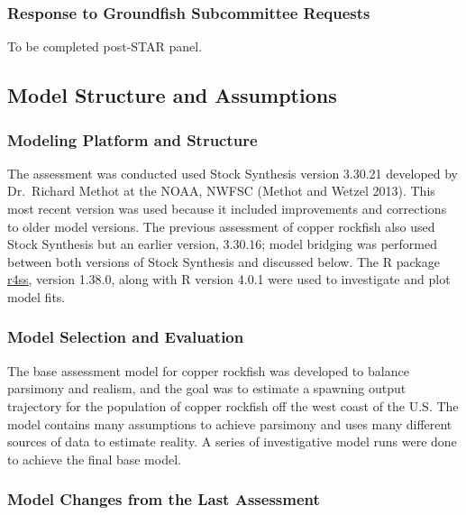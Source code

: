 \documentclass[11pt,
  english,
  letterpaper,
]{article}
\begin{document}
\hypertarget{response-to-groundfish-subcommittee-requests}{%
\subsubsection{Response to Groundfish Subcommittee Requests}\label{response-to-groundfish-subcommittee-requests}}

To be completed post-STAR panel.

\hypertarget{model-structure-and-assumptions}{%
\subsection{Model Structure and Assumptions}\label{model-structure-and-assumptions}}

\hypertarget{modeling-platform-and-structure}{%
\subsubsection{Modeling Platform and Structure}\label{modeling-platform-and-structure}}

The assessment was conducted used Stock Synthesis version 3.30.21 developed by Dr.~Richard Methot at the NOAA, NWFSC (Methot and Wetzel 2013). This most recent version was used because it included improvements and corrections to older model versions. The previous assessment of copper rockfish also used Stock Synthesis but an earlier version, 3.30.16; model bridging was performed between both versions of Stock Synthesis and discussed below. The R package \href{https://github.com/r4ss/r4ss}{r4ss}, version 1.38.0, along with R version 4.0.1 were used to investigate and plot model fits.

\hypertarget{model-selection-and-evaluation}{%
\subsubsection{Model Selection and Evaluation}\label{model-selection-and-evaluation}}

The base assessment model for copper rockfish was developed to balance parsimony and realism, and the goal was to estimate a spawning output trajectory for the population of copper rockfish off the west coast of the U.S. The model contains many assumptions to achieve parsimony and uses many different sources of data to estimate reality. A series of investigative model runs were done to achieve the final base model.

\hypertarget{model-changes-from-the-last-assessment}{%
\subsubsection{Model Changes from the Last Assessment}\label{model-changes-from-the-last-assessment}}
\end{document}
